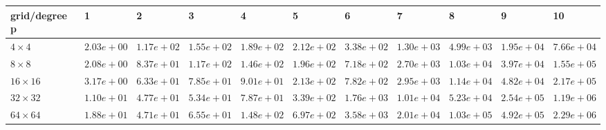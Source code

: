 \begin{tabular}{lllllllllll}
\hline
 grid/degree p   & 1          & 2          & 3          & 4          & 5          & 6          & 7          & 8          & 9          & 10         \\
\hline
 $4 \times 4$    & $2.03e+00$ & $1.17e+02$ & $1.55e+02$ & $1.89e+02$ & $2.12e+02$ & $3.38e+02$ & $1.30e+03$ & $4.99e+03$ & $1.95e+04$ & $7.66e+04$ \\
 $8 \times 8$    & $2.08e+00$ & $8.37e+01$ & $1.17e+02$ & $1.46e+02$ & $1.96e+02$ & $7.18e+02$ & $2.70e+03$ & $1.03e+04$ & $3.97e+04$ & $1.55e+05$ \\
 $16 \times 16$  & $3.17e+00$ & $6.33e+01$ & $7.85e+01$ & $9.01e+01$ & $2.13e+02$ & $7.82e+02$ & $2.95e+03$ & $1.14e+04$ & $4.82e+04$ & $2.17e+05$ \\
 $32 \times 32$  & $1.10e+01$ & $4.77e+01$ & $5.34e+01$ & $7.87e+01$ & $3.39e+02$ & $1.76e+03$ & $1.01e+04$ & $5.23e+04$ & $2.54e+05$ & $1.19e+06$ \\
 $64 \times 64$  & $1.88e+01$ & $4.71e+01$ & $6.55e+01$ & $1.48e+02$ & $6.97e+02$ & $3.58e+03$ & $2.01e+04$ & $1.03e+05$ & $4.92e+05$ & $2.29e+06$ \\
\hline
\end{tabular}